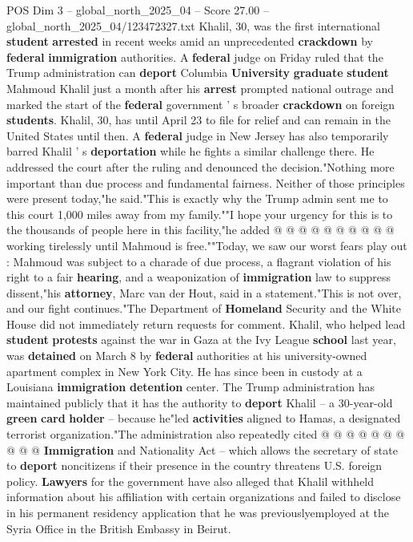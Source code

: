 \begin{textsample}{POS Dim 3 – global\_north\_2025\_04 – Score 27.00 – global\_north\_2025\_04/123472327.txt}  \label{ex:f3_pos_060}
Khalil, 30, was the first international \textbf{student} \textbf{arrested} in recent weeks amid an unprecedented \textbf{crackdown} by \textbf{federal} \textbf{immigration} authorities.
A \textbf{federal} judge on Friday ruled that the Trump administration can \textbf{deport} Columbia \textbf{University} \textbf{graduate} \textbf{student} Mahmoud Khalil just a month after his \textbf{arrest} prompted national outrage and marked the start of the \textbf{federal} government ' s broader \textbf{crackdown} on foreign \textbf{students}.
Khalil, 30, has until April 23 to file for relief and can remain in the United States until then.
A \textbf{federal} judge in New Jersey has also temporarily barred Khalil ' s \textbf{deportation} while he fights a similar challenge there.
He addressed the court after the ruling and denounced the decision."Nothing more important than due process and fundamental fairness.
Neither of those principles were present today,"he said."This is exactly why the Trump admin sent me to this court 1,000 miles away from my family.""I hope your urgency for this is to the thousands of people here in this facility,"he added @ @ @ @ @ @ @ @ @ @ working tirelessly until Mahmoud is free.""Today, we saw our worst fears play out : Mahmoud was subject to a charade of due process, a flagrant violation of his right to a fair \textbf{hearing}, and a weaponization of \textbf{immigration} law to suppress dissent,"his \textbf{attorney}, Marc van der Hout, said in a statement."This is not over, and our fight continues."The Department of \textbf{Homeland} Security and the White House did not immediately return requests for comment.
Khalil, who helped lead \textbf{student} \textbf{protests} against the war in Gaza at the Ivy League \textbf{school} last year, was \textbf{detained} on March 8 by \textbf{federal} authorities at his university-owned apartment complex in New York City.
He has since been in custody at a Louisiana \textbf{immigration} \textbf{detention} center.
The Trump administration has maintained publicly that it has the authority to \textbf{deport} Khalil -- a 30-year-old \textbf{green} \textbf{card} \textbf{holder} -- because he"led \textbf{activities} aligned to Hamas, a designated terrorist organization."The administration also repeatedly cited @ @ @ @ @ @ @ @ @ @ \textbf{Immigration} and Nationality Act -- which allows the secretary of state to \textbf{deport} noncitizens if their presence in the country threatens U.S. foreign policy. \textbf{Lawyers} for the government have also alleged that Khalil withheld information about his affiliation with certain organizations and failed to disclose in his permanent residency application that he was previouslyemployed at the Syria Office in the British Embassy in Beirut.

\end{textsample}
